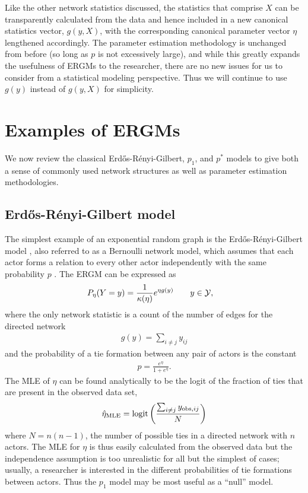 Like the other network statistics discussed, the statistics that comprise $X$ can 
be transparently calculated from the data and hence included in a new canonical 
statistics vector, $g(y, X)$,
with the corresponding canonical parameter vector $\eta$ lengthened accordingly.
The parameter estimation methodology is unchanged from before (so long as $p$ is not
excessively large), and while this greatly expands the
usefulness of ERGMs to the researcher, there are no new issues for us to consider
from a statistical modeling perspective.
Thus we will continue to use $g(y)$ instead of $g(y,X)$ for simplicity.



\section{Examples of ERGMs} \label{S:ERGM examples}
We now review the classical Erd\H{o}s-R\'{e}nyi-Gilbert, $p_1$, and $p^*$ models to give both a sense of commonly used network structures as well as parameter estimation methodologies.

\subsection{Erd\H{o}s-R\'{e}nyi-Gilbert model} \label{S:Erdos}
The simplest example of an exponential random graph is the Erd\H{o}s-R\'{e}nyi-Gilbert 
model \citep{Erdos,Gilbert}, also referred to as a Bernoulli network model, which 
assumes that each actor forms a relation to every other actor independently with the 
same probability $p$ \citep{Wasserman:1994, ergm}.  The ERGM can be expressed as
\begin{align*}
	P_{\eta}(Y=y) &= \frac{1}{\kappa( \eta) }e^{\eta g(y)}  \qquad y \in {\mathcal Y}, 
\end{align*}
where the only network statistic is a count of the number of edges for the directed network
\begin{align*}
	g(y) = \sum_{i \neq j} y_{ij}
\end{align*}
and the probability of a tie formation between any pair of actors is the constant
\begin{align*}
	p = \frac{e^{\eta}}{1+e^{\eta}}.
\end{align*}
The MLE of $\eta$ can be found analytically to be the logit of the 
fraction of ties that are present in the observed data set, 
\begin{align*}
	\hat{\eta}_{\textrm{MLE}} = \operatorname{logit} \left ( \frac{\sum_{i \neq j} y_{\textrm{obs}, ij}}{ N } \right )
\end{align*}
where $N = n(n-1)$, the number of possible ties in a directed network with $n$ actors.  
The MLE 
for $\eta$ is thus easily calculated from the observed data but the independence 
assumption is too unrealistic for all but the simplest of cases; usually, 
a researcher is interested in the different probabilities of tie formations 
between actors.  Thus the $p_1$ model may be most useful as a ``null'' model.

